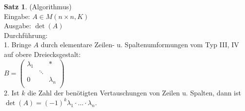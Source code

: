 \documentclass[10pt,a4paper,numbers=endperiod]{scrartcl}
\theoremstyle{definition}
\newtheorem{satz}{Satz}[section]
\begin{document}
\begin{satz}
	(Algorithmus)\\
	Eingabe: $A \in M(n\times n, K)$\\
	Ausgabe: $\det(A)$\\
	Durchführung:\\
	1. Bringe $A$ durch elementare Zeilen- u. Spaltenumformungen vom Typ III, IV auf obere Dreiecksgestalt:\\
	
	$B = \begin{pmatrix}
	\lambda_1 & & *\\
	&\ddots& \\
	0&&\lambda_n\\
	\end{pmatrix}$\\
	
	2. Ist $k$ die Zahl der benötigten Vertauschungen von Zeilen u. Spalten, dann ist $\det(A) = (-1)^k \lambda_1 \cdot \dots \cdot \lambda_n$. 
\end{satz}
\end{document}
